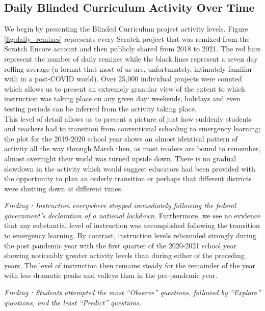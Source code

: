\documentclass[sigconf,manuscript,review,anonymous]{acmart} %
\newcommand{\Scratchencore}[0]{Blinded Curriculum}
\begin{document}
\subsection{Daily \Scratchencore{} Activity Over Time}
We begin by presenting the \Scratchencore{} project activity levels. Figure \ref{fig:daily_remixes}
 represents every Scratch project that was remixed from the Scratch Encore account and 
 then publicly shared from 2018 to 2021. The red bars represent the number of daily remixes 
 while the black lines represent a seven day rolling average (a format that most of us are, 
 unfortunately, intimately familiar with in a post-COVID world). Over 25,000 individual 
 projects were counted which allows us to present an extremely granular view of the extent 
 to which instruction was taking place on any given day: weekends, holidays and even 
 testing periods can be inferred from the activity taking place.\\
This level of detail allows us to present a picture of just how suddenly students and teachers
 had to transition from conventional schooling to emergency learning; the plot for the 
 2019-2020 school year shows an almost identical pattern of activity all the way through 
 March then, as most readers are bound to remember, almost overnight their world was 
 turned upside down. There is no gradual slowdown in the activity which would suggest 
 educators had been provided with the opportunity to plan an orderly transition or perhaps 
 that different districts were shutting down at different times.


\textit{Finding : Instruction everywhere stopped immediately following the federal government’s declaration of a national lockdown.}
Furthermore, we see no evidence that any substantial level of instruction was accomplished
following the transition to emergency learning. By contrast, instruction levels rebounded
strongly during the post pandemic year with the first quarter of the 2020-2021 
school year showing noticeably greater activity levels than during either of the preceding 
years. The level of instruction then remains steady for the remainder of the year with less dramatic 
peaks and valleys than in the pre-pandemic year.



\textit{Finding : Students attempted the most ``Observe'' questions, followed by ``Explore'' questions, and the least ``Predict'' questions.}
\end{document}
